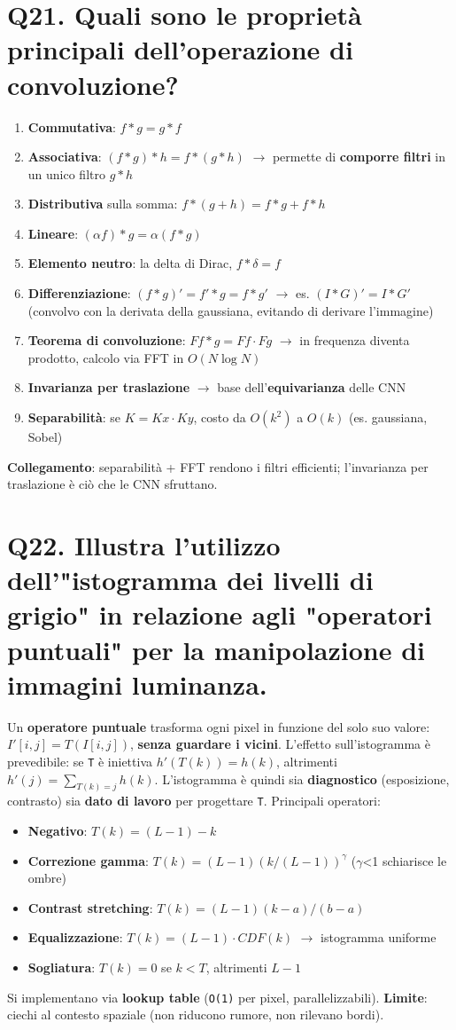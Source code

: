 \documentclass[11pt,a4paper]{article}
\begin{document}
\section*{Q21. Quali sono le proprietà principali dell'operazione di convoluzione?}
\begin{enumerate}
\item \textbf{Commutativa}: $f*g = g*f$
\item \textbf{Associativa}: $(f*g)*h = f*(g*h)$ $\to $ permette di \textbf{comporre filtri} in un unico filtro $g*h$
\item \textbf{Distributiva} sulla somma: $f*(g+h) = f*g + f*h$
\item \textbf{Lineare}: $(\alpha f)*g = \alpha (f*g)$
\item \textbf{Elemento neutro}: la delta di Dirac, $f*\delta  = f$
\item \textbf{Differenziazione}: $(f*g)' = f'*g = f*g'$ $\to $ es. $(I*G)' = I*G'$ (convolvo con la derivata della gaussiana, evitando di derivare l'immagine)
\item \textbf{Teorema di convoluzione}: $F{f*g} = F{f}\cdot F{g}$ $\to $ in frequenza diventa prodotto, calcolo via FFT in $O(N \operatorname{log} N)$
\item \textbf{Invarianza per traslazione} $\to $ base dell'\textbf{equivarianza} delle CNN
\item \textbf{Separabilità}: se $K = Kx\cdot Ky$, costo da $O(k^{2})$ a $O(k)$ (es. gaussiana, Sobel)
\end{enumerate}
\textbf{Collegamento}: separabilità + FFT rendono i filtri efficienti; l'invarianza per traslazione è ciò che le CNN sfruttano.
\newpage
\section*{Q22. Illustra l'utilizzo dell'"istogramma dei livelli di grigio" in relazione agli "operatori puntuali" per la manipolazione di immagini luminanza.}
Un \textbf{operatore puntuale} trasforma ogni pixel in funzione del solo suo valore: $I'[i,j] = T(I[i,j])$, \textbf{senza guardare i vicini}. L'effetto sull'istogramma è prevedibile: se \texttt{T} è iniettiva $h'(T(k)) = h(k)$, altrimenti $h'(j)=\sum _{T(k)=j} h(k)$. L'istogramma è quindi sia \textbf{diagnostico} (esposizione, contrasto) sia \textbf{dato di lavoro} per progettare \texttt{T}.
Principali operatori:
\begin{itemize}
\item \textbf{Negativo}: $T(k) = (L-1) - k$
\item \textbf{Correzione gamma}: $T(k) = (L-1)(k/(L-1))^\gamma $ ($\gamma $<1 schiarisce le ombre)
\item \textbf{Contrast stretching}: $T(k) = (L-1)(k-a)/(b-a)$
\item \textbf{Equalizzazione}: $T(k) = (L-1)\cdot CDF(k)$ $\to $ istogramma uniforme
\item \textbf{Sogliatura}: $T(k) = 0$ se $k<T$, altrimenti $L-1$
\end{itemize}
Si implementano via \textbf{lookup table} (\texttt{O(1)} per pixel, parallelizzabili). \textbf{Limite}: ciechi al contesto spaziale (non riducono rumore, non rilevano bordi).
\newpage
\end{document}
